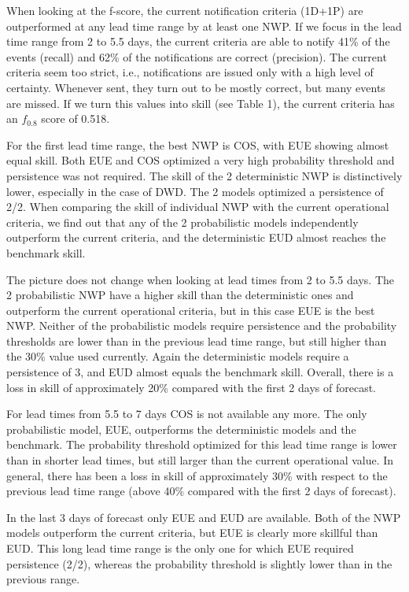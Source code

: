 \documentclass[preprint,12pt]{elsarticle}
\begin{document}
When looking at the f-score, the current notification criteria (1D+1P) are outperformed at any lead time range by at least one NWP. If we focus in the lead time range from 2 to 5.5 days, the current criteria are able to notify 41\% of the events (recall) and 62\% of the notifications are correct (precision). The current criteria seem too strict, i.e., notifications are issued only with a high level of certainty. Whenever sent, they turn out to be mostly correct, but many events are missed. If we turn this values into skill (see Table 1), the current criteria  has an $f_{0.8}$ score of 0.518.

For the first lead time range, the best NWP is COS, with EUE showing almost equal skill. Both EUE and COS optimized a very high probability threshold and persistence was not required. The skill of the 2 deterministic NWP is distinctively lower, especially in the case of DWD. The 2 models optimized a persistence of 2/2. When comparing the skill of individual NWP with the current operational criteria, we find out that any of the 2 probabilistic models independently outperform the current criteria, and the deterministic EUD almost reaches the benchmark skill.

The picture does not change when looking at lead times from 2 to 5.5 days. The 2 probabilistic NWP have a higher skill than the deterministic ones and outperform the current operational criteria, but in this case EUE is the best NWP. Neither of the probabilistic models require persistence and the probability thresholds are lower than in the previous lead time range, but still higher than the 30\% value used currently. Again the deterministic models require a persistence of 3, and EUD almost equals the benchmark skill. Overall, there is a loss in skill of approximately 20\% compared with the first 2 days of forecast. 

For lead times from 5.5 to 7 days COS is not available any more. The only probabilistic model, EUE, outperforms the deterministic models and the benchmark. The probability threshold optimized for this lead time range is lower than in shorter lead times, but still larger than the current operational value. In general, there has been a loss in skill of approximately 30\% with respect to the previous lead time range (above 40\% compared with the first 2 days of forecast).

In the last 3 days of forecast only EUE and EUD are available. Both of the NWP models outperform the current criteria, but EUE is clearly more skillful than EUD. This long lead time range is the only one for which EUE required persistence (2/2), whereas the probability threshold is slightly lower than in the previous range.
\end{document}
